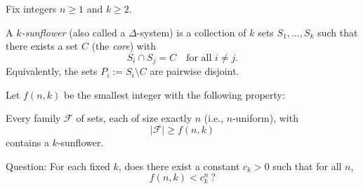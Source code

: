 Fix integers $n\ge 1$ and $k\ge 2$.

A \emph{$k$-sunflower} (also called a $\Delta$-system) is a collection of $k$ sets $S_1,\dots,S_k$ such that there exists a set $C$ (the \emph{core}) with
\[
S_i\cap S_j = C\quad\text{for all }i\ne j.
\]
Equivalently, the sets $P_i:=S_i\setminus C$ are pairwise disjoint.

Let $f(n,k)$ be the smallest integer with the following property:

Every family $\mathcal F$ of sets, each of size exactly $n$ (i.e., $n$-uniform), with
\[
|\mathcal F|\ge f(n,k)
\]
contains a $k$-sunflower.

Question: For each fixed $k$, does there exist a constant $c_k>0$ such that for all $n$,
\[
f(n,k) < c_k^n\ ?
\]
